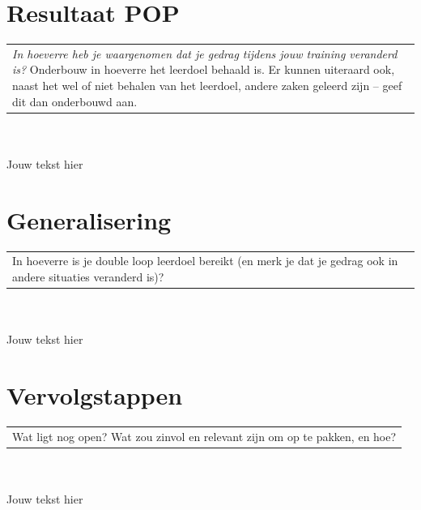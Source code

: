 \documentclass[12pt, a4paper, dutch]{article}
\begin{document}
\section{\small Resultaat POP} \label{section:Resultaat_POP}
\begin{tabular}{p{}}
    \cellcolor{lightgray!30}\tiny \textit{In hoeverre heb je waargenomen dat je gedrag tijdens jouw training veranderd is?} Onderbouw in hoeverre het leerdoel behaald is. Er kunnen uiteraard ook, naast het wel of niet behalen van het leerdoel, andere zaken
geleerd zijn – geef dit dan onderbouwd aan.
\end{tabular}\\\\
Jouw tekst hier

\section{\small Generalisering} \label{section:Generalisering_Evaluatie}
\begin{tabular}{p{}}
    \cellcolor{lightgray!30}\tiny In hoeverre is je double loop leerdoel bereikt (en merk je dat je gedrag ook in andere situaties veranderd is)?
\end{tabular}\\\\
Jouw tekst hier

\section{\small Vervolgstappen} \label{section:Vervolgstappen}
\begin{tabular}{p{}}
    \cellcolor{lightgray!30}\tiny Wat ligt nog open? Wat zou zinvol en relevant zijn om op te pakken, en hoe?
\end{tabular}\\\\
Jouw tekst hier
\end{document}
